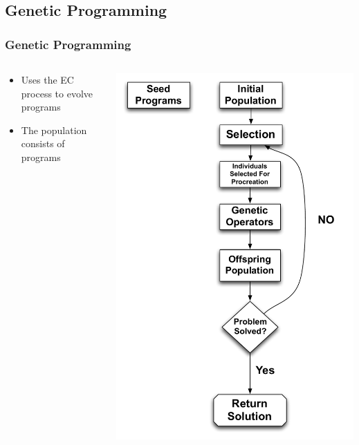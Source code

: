 \documentclass{beamer}
\begin{document}
\subsection[Genetic Programming]{Genetic Programming}
\begin{frame}
	\frametitle{Genetic Programming}
\begin{columns}[T]
\begin{column}{0.5\textwidth}
\begin{itemize}	
	\item Uses the EC process to evolve programs
	\item The population consists of programs
	
\end{itemize}
\end{column}
\begin{column}{0.5\textwidth}
   \includegraphics[height=0.85\textheight]{Illustrations/GP1.pdf}
       \\
\end{column}
\end{columns}

\end{frame}
\end{document}
